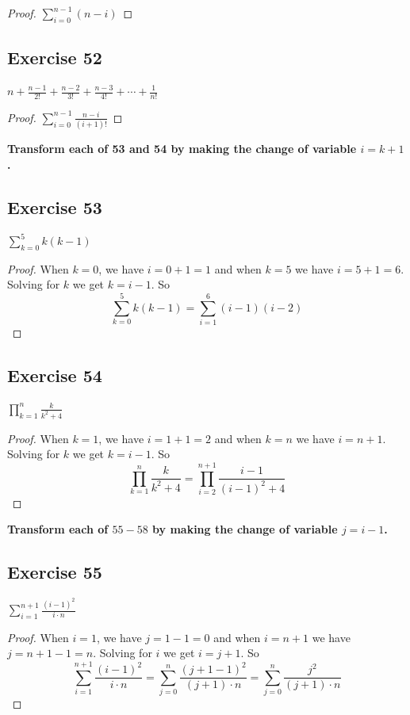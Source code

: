 \documentclass[14pt]{extarticle}
\newcommand{\dps}{\displaystyle}
\newcommand{\cy}{\color{cyan}}
\begin{document}
\begin{proof}
$\dps\sum_{i=0}^{n-1}(n-i)$
\end{proof}

\subsection{Exercise 52}
$\dps n + \frac{n-1}{2!} + \frac{n-2}{3!} + \frac{n-3}{4!} + \cdots + \frac{1}{n!}$

\begin{proof}
$\dps\sum_{i=0}^{n-1}\frac{n-i}{(i+1)!}$
\end{proof}

{\bf\cy Transform each of 53 and 54 by making the change of
variable $i = k + 1$.}

\subsection{Exercise 53}
$\dps\sum_{k=0}^{5}k(k-1)$

\begin{proof}
When $k = 0$, we have $i = 0+1 = 1$ and when $k = 5$ we have $i = 5+1 = 6$. Solving for $k$ we get $k = i-1$. So
\[
\sum_{k=0}^{5}k(k-1) = \sum_{i=1}^{6}(i-1)(i-2)
\]
\end{proof}

\subsection{Exercise 54}
$\dps\prod_{k=1}^{n}\frac{k}{k^2+4}$

\begin{proof}
When $k = 1$, we have $i = 1+1 = 2$ and when $k = n$ we have $i = n+1$. Solving for $k$ we get $k = i-1$. So
\[
\prod_{k=1}^{n}\frac{k}{k^2+4} = \prod_{i=2}^{n+1}\frac{i-1}{(i-1)^2+4}
\]
\end{proof}

{\bf\cy Transform each of $55-58$ by making the change of variable $j = i - 1$.}

\subsection{Exercise 55}
$\dps\sum_{i=1}^{n+1}\frac{(i-1)^2}{i\cdot n}$

\begin{proof}
When $i = 1$, we have $j = 1-1 = 0$ and when $i = n+1$ we have $j = n+1-1 = n$. Solving for $i$ we get $i = j+1$. So
\[
\sum_{i=1}^{n+1}\frac{(i-1)^2}{i\cdot n} = \sum_{j=0}^{n}\frac{(j+1-1)^2}{(j+1)\cdot n} = \sum_{j=0}^{n}\frac{j^2}{(j+1)\cdot n}
\]
\end{proof}
\end{document}
